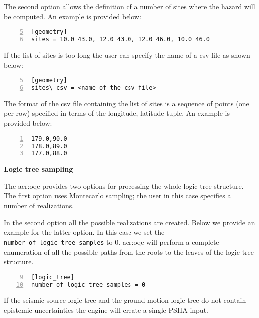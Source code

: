The second option allows the definition of a number of sites where the hazard
will be computed. An example is provided below:

\begin{Verbatim}[frame=single, commandchars=\\\{\}, fontsize=\small,
    firstnumber=5, numbers=left, numbersep=2pt]
[geometry]
sites = 10.0 43.0, 12.0 43.0, 12.0 46.0, 10.0 46.0
\end{Verbatim}

If the list of sites is too long the user can specify the name of a csv file
as shown below:

\begin{Verbatim}[frame=single, commandchars=\\\{\}, fontsize=\small,
    firstnumber=5, numbers=left, numbersep=2pt]
[geometry]
sites\_csv = <name_of_the_csv_file>
\end{Verbatim}

The format of the csv file containing the list of sites is a sequence of
points (one per row) specified in terms of the longitude, latitude tuple. An
example is provided below:

\begin{Verbatim}[frame=single, commandchars=\\\{\}, fontsize=\small,
    firstnumber=1, numbers=left, numbersep=2pt]
179.0,90.0
178.0,89.0
177.0,88.0
\end{Verbatim}



\textbf{Logic tree sampling}

The \gls{acr:oqe} provides two options for processing the whole logic tree
structure. The first option uses Montecarlo sampling; the user in this case
specifies a number of realizations.

In the second option all the possible realizations are created. Below we
provide an example for the latter option. In this case we set the
\texttt{number\-\_of\-\_logic\_tree\_samples} to 0. \gls{acr:oqe} will perform
a complete enumeration of all  the possible paths from the roots to the leaves
of the logic tree  structure.

\begin{Verbatim}[frame=single, commandchars=\\\{\}, fontsize=\small,
    firstnumber=9, numbers=left, numbersep=2pt]
[logic_tree]
number_of_logic_tree_samples = 0
\end{Verbatim}

If the seismic source logic tree and the ground motion logic tree do not
contain epistemic uncertainties the engine will create a single PSHA input.



